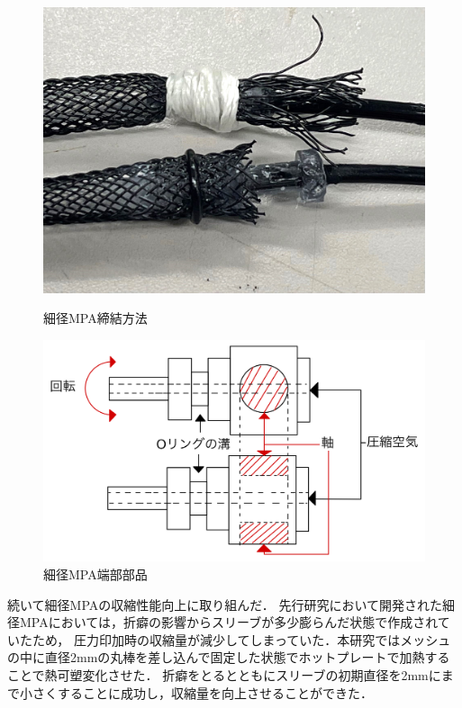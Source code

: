 \documentclass{jarticle}
\begin{document}
\begin{figure}[H]
  \begin{minipage}[b]{0.47\columnwidth}
    \centering
    \includegraphics[scale=0.05]{image/mpa_oring_1.jpg}
    \vspace{-2mm}
    \caption{細径MPA締結方法}
    \label{fig:OringMPA}
  \end{minipage}
  \hspace{0.04\columnwidth}
  \begin{minipage}[b]{0.47\columnwidth}
    \centering
    \includegraphics[scale=0.047]{image/MPA_irast.jpg}
    \vspace{-2mm}
    \caption{細径MPA端部部品}
    \label{fig:MPAparts}
  \end{minipage}
\end{figure}


続いて細径MPAの収縮性能向上に取り組んだ．
先行研究において開発された細径MPAにおいては，折癖の影響からスリーブが多少膨らんだ状態で作成されていたため，
圧力印加時の収縮量が減少してしまっていた．本研究ではメッシュの中に直径2mmの丸棒を差し込んで固定した状態でホットプレートで加熱することで熱可塑変化させた．
折癖をとるとともにスリーブの初期直径を2mmにまで小さくすることに成功し，収縮量を向上させることができた．
\end{document}
